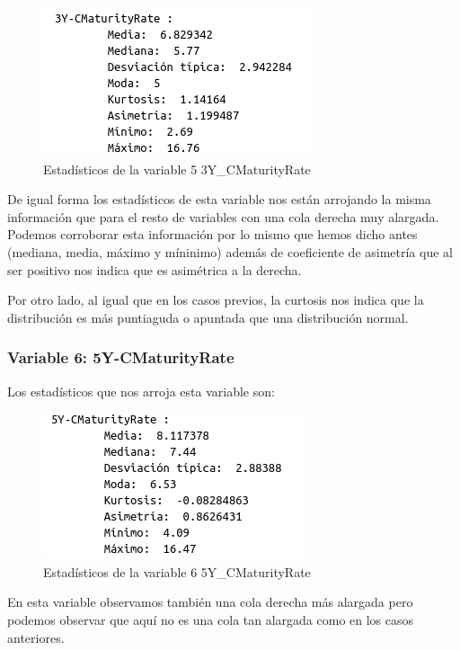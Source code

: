 \documentclass[12pt,a4paper]{article}
\begin{document}
\begin{figure}[H]
	\centering
	\includegraphics[scale=0.7]{./Imagenes/estadisticos_3Y_CMaturityRate.png}
	\caption{Estadísticos de la variable 5 3Y\_CMaturityRate}
\end{figure}

De igual forma los estadísticos de esta variable nos están arrojando la misma información que para el resto de variables con una cola derecha muy alargada. Podemos corroborar esta información por lo mismo que hemos dicho antes (mediana, media, máximo y míninimo) además de coeficiente de asimetría que al ser positivo nos indica que es asimétrica a la derecha.

Por otro lado, al igual que en los casos previos, la curtosis nos indica que la distribución es más puntiaguda o apuntada que una distribución normal.

\subsubsection*{Variable 6: 5Y-CMaturityRate}

Los estadísticos que nos arroja esta variable son:

\begin{figure}[H]
	\centering
	\includegraphics[scale=0.7]{./Imagenes/estadisticos_5Y_CMaturityRate.png}
	\caption{Estadísticos de la variable 6 5Y\_CMaturityRate}
\end{figure}

En esta variable observamos también una cola derecha más alargada pero podemos observar que aquí no es una cola tan alargada como en los casos anteriores. 
\end{document}

